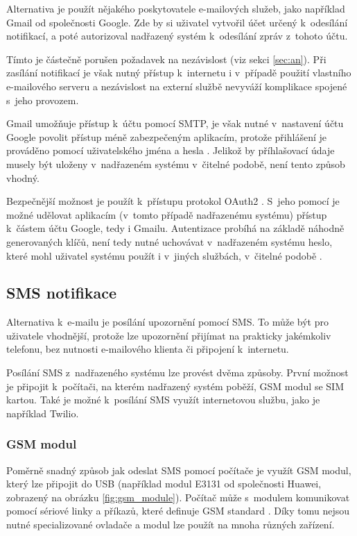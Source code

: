 Alternativa je použít nějakého poskytovatele e-mailových služeb, jako například Gmail od společnosti Google. Zde by si uživatel vytvořil účet určený k~odesílání notifikací, a poté autorizoval nadřazený systém k~odesílání zpráv z~tohoto účtu. 

Tímto je částečně porušen požadavek na nezávislost (viz sekci \ref{sec:an}). Při zasílání notifikací je však nutný přístup k~internetu i v~případě použití vlastního e-mailového serveru a nezávislost na externí službě nevyváží komplikace spojené s~jeho provozem.

Gmail umožňuje přístup k~účtu pomocí SMTP, je však nutné v~nastavení účtu Google povolit přístup méně zabezpečeným aplikacím, protože přihlášení je prováděno pomocí uživatelského jména a hesla \cite{google_smtp}. Jelikož by příhlašovací údaje musely být uloženy v~nadřazeném systému v~čitelné podobě, není tento způsob vhodný.

Bezpečnější možnost je použít k~přístupu protokol OAuth2 \cite{rfc6749}. S~jeho pomocí je možné udělovat aplikacím (v~tomto případě nadřazenému systému) přístup k~částem účtu Google, tedy i Gmailu. Autentizace probíhá na základě náhodně generovaných klíčů, není tedy nutné uchovávat v~nadřazeném systému heslo, které mohl uživatel systému použít i v~jiných službách, v~čitelné podobě \cite{google_oauth}.


\subsection{SMS notifikace}

Alternativa k~e-mailu je posílání upozornění pomocí SMS. To může být pro uživatele vhodnější, protože lze upozornění přijímat na prakticky jakémkoliv telefonu, bez nutnosti e-mailového klienta či připojení k~internetu.

Posílání SMS z~nadřazeného systému lze provést dvěma způsoby. První možnost je připojit k~počítači, na kterém nadřazený systém poběží, GSM modul se SIM kartou. Také je možné k~posílání SMS využít internetovou službu, jako je například Twilio.

\subsubsection{GSM modul}

Poměrně snadný způsob jak odeslat SMS pomocí počítače je využít GSM modul, který lze připojit do USB (například modul E3131 od společnosti Huawei, zobrazený na obrázku \ref{fig:gsm_module}). Počítač může s~modulem komunikovat pomocí sériové linky a příkazů, které definuje GSM standard \cite{gsm_standard}. Díky tomu nejsou nutné specializované ovladače a modul lze použít na mnoha různých zařízení.

